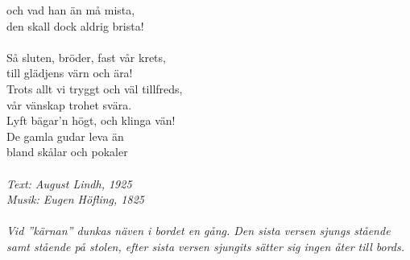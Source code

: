 och vad han än må mista,\\
den skall dock aldrig brista!\\
\\
Så sluten, bröder, fast vår krets,\\
till glädjens värn och ära!\\
Trots allt vi tryggt och väl tillfreds,\\
vår vänskap trohet svära.\\
Lyft bägar’n högt, och klinga vän!\\
De gamla gudar leva än\\
\revrpt bland skålar och pokaler\rpt\\
\\
{\footnotesize\textit{Text: August Lindh, 1925\\
Musik: Eugen Höfling, 1825\\
\\
Vid ”kärnan” dunkas näven i bordet en gång. Den sista versen sjungs stående samt stående på stolen, efter sista versen sjungits sätter sig ingen åter till bords.}}
\clearpage
